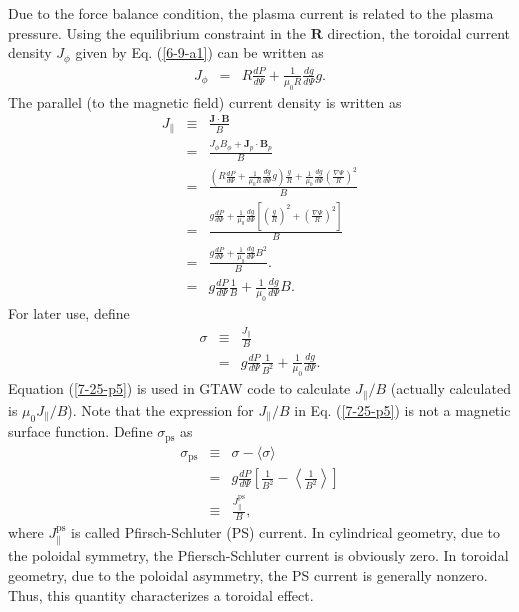 \documentclass{article}
\newcommand{\tmop}[1]{\ensuremath{\operatorname{#1}}}
\begin{document}
Due to the force balance condition, the plasma current is related to the
plasma pressure. Using the equilibrium constraint in the $\mathbf{R}$
direction, the toroidal current density $J_{\phi}$ given by Eq. (\ref{6-9-a1})
can be written as
\begin{eqnarray}
  J_{\phi} & = & R \frac{d P}{d \Psi} + \frac{1}{\mu_0 R}  \frac{d g}{d \Psi}
  g.  \label{4-10-1}
\end{eqnarray}
The parallel (to the magnetic field) current density is written as
\begin{eqnarray}
  J_{\parallel} & \equiv & \frac{\mathbf{J} \cdot \mathbf{B}}{B} \nonumber\\
  & = & \frac{J_{\phi} B_{\phi} +\mathbf{J}_p \cdot \mathbf{B}_p}{B}
  \nonumber\\
  & = & \frac{\left( R \frac{d P}{d \Psi} + \frac{1}{\mu_0 R}  \frac{d g}{d
  \Psi} g \right) \frac{g}{R} + \frac{1}{\mu_0}  \frac{d g}{d \Psi} \left(
  \frac{\nabla \Psi}{R} \right)^2}{B} \nonumber\\
  & = & \frac{g \frac{d P}{d \Psi} + \frac{1}{\mu_0}  \frac{d g}{d \Psi}
  \left[  \left( \frac{g}{R} \right)^2 + \left( \frac{\nabla \Psi}{R}
  \right)^2 \right]}{B} \nonumber\\
  & = & \frac{g \frac{d P}{d \Psi} + \frac{1}{\mu_0}  \frac{d g}{d \Psi}
  B^2}{B} . \nonumber\\
  & = & g \frac{d P}{d \Psi}  \frac{1}{B} + \frac{1}{\mu_0}  \frac{d g}{d
  \Psi} B. 
\end{eqnarray}
For later use, define
\begin{eqnarray}
  \sigma & \equiv & \frac{J_{\parallel}}{B} \nonumber\\
  & = & g \frac{d P}{d \Psi}  \frac{1}{B^2} + \frac{1}{\mu_0}  \frac{d g}{d
  \Psi} .  \label{7-25-p5}
\end{eqnarray}
Equation (\ref{7-25-p5}) is used in GTAW code to calculate $J_{\parallel} / B$
(actually calculated is $\mu_0 J_{\parallel} / B$){\cite{hu2014}}. Note that
the expression for $J_{\parallel} / B$ in Eq. (\ref{7-25-p5}) is not a
magnetic surface function. Define $\sigma_{\tmop{ps}}$ as
\begin{eqnarray}
  \sigma_{\tmop{ps}} & \equiv & \sigma - \langle \sigma \rangle \nonumber\\
  & = & g \frac{d P}{d \Psi} \left[  \frac{1}{B^2} - \left\langle
  \frac{1}{B^2} \right\rangle \right] \\
  & \equiv & \frac{J_{\parallel}^{\tmop{ps}}}{B}, 
\end{eqnarray}
where $J_{\parallel}^{\tmop{ps}}$ is called Pfirsch-Schluter (PS) current. In
cylindrical geometry, due to the poloidal symmetry, the Pfiersch-Schluter
current is obviously zero. In toroidal geometry, due to the poloidal
asymmetry, the PS current is generally nonzero. Thus, this quantity
characterizes a toroidal effect.
\end{document}

